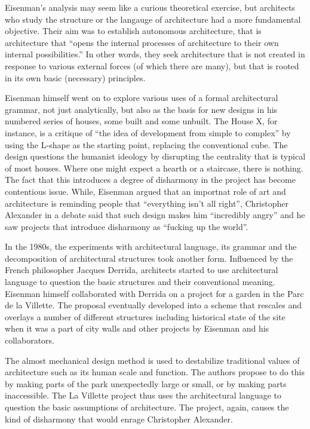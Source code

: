 Eisenman's analysis may seem like a curious theoretical exercise, but architects who study
the structure or the langauge of architecture had a more fundamental objective. Their aim
was to establish autonomous architecture, that is architecture that ``opens the internal
processes of architecture to their own internal possibilities.''
In other words, they seek architecture that is not created in response
to various external forces (of which there are many), but that is rooted in its own basic
(necessary) principles.

Eisenman himself went on to explore various uses of a formal architectural
grammar, not just analytically, but also as the basis for new designs in his numbered series of
houses, some built and some unbuilt. The House X, for instance, is a critique of ``the idea of
development from simple to complex'' by using the L-shape as the
starting point, replacing the conventional cube. The design questions the humanist ideology
by disrupting the centrality that is typical of most houses. Where one might expect a hearth or
a staircase, there is nothing. The fact that this introduces a degree of disharmony in the project
has become contentious issue. While, Eisenman argued that an importnat role of art and architecture
is reminding people that ``everything isn't all right'', Christopher Alexander in a debate said
that such design makes him ``incredibly angry'' and he saw projects that introduce disharmony
as ``fucking up the world''.

In the 1980s, the experiments with architectural language, its grammar and the decomposition
of architectural structures took another form. Influenced by the French philosopher Jacques
Derrida, architects started to use architectural language to question the basic structures
and their conventional meaning. Eisenman himself collaborated with Derrida on a
project for a garden in the Parc de la Villette. The proposal eventually developed
 into a scheme that rescales and overlays a number of different structures including
historical state of the site when it was a part of city walls and other projects by Eisenman
and his collaborators.

The almost mechanical design method is used to destabilize traditional
values of architecture such as its human scale and function. The authors propose to do this by
making parts of the park unexpectedly large or small, or by making parts inaccessible.
The La Villette project thus uses the architectural language to question the basic assumptions
of architecture. The project, again, causes the kind of disharmony that would enrage Christopher
Alexander.

